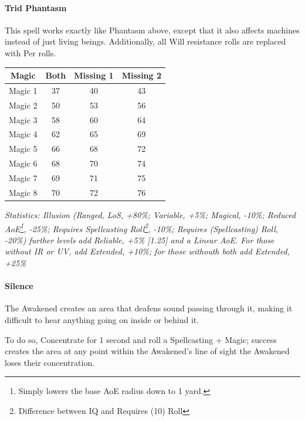 \begin{multicols*}{3}
	\paragraph{Trid Phantasm}
	
	This spell works exactly like Phantasm above, except that it also affects machines instead of just living beings. Additionally, all Will resistance rolls are replaced with Per rolls.
	
	\begin{center}
		\begin{adjustwidth}{-2.5mm}{}
		\begin{tabular}{|c|c|c|c|}
			\hline
			Magic & Both & Missing 1 & Missing 2 \\
			\hline
			\hline
			Magic 1 & 37 & 40 & 43 \\
			Magic 2 & 50 & 53 & 56 \\
			Magic 3 & 58 & 60 & 64 \\
			Magic 4 & 62 & 65 & 69 \\
			Magic 5 & 66 & 68 & 72 \\
			Magic 6 & 68 & 70 & 74 \\
			Magic 7 & 69 & 71 & 75 \\
			Magic 8 & 70 & 72 & 76 \\
			\hline
		\end{tabular}
		\end{adjustwidth}
	\end{center}
	
	\textcolor{OliveGreen}{\textit{Statistics: Illusion (Ranged, LoS, +80\%; Variable, +5\%; Magical, -10\%; Reduced AoE\footnote{Simply lowers the base AoE radius down to 1 yard.}, -25\%; Requires Spellcasting Roll\footnote{Difference between IQ and Requires (10) Roll}, -10\%; Requires (Spellcasting) Roll, -20\%) further levels add Reliable, +5\% [1.25] and a Linear AoE. For those without IR or UV, add Extended, +10\%; for those withouth both add Extended, +25\%}}
	
	\paragraph{Silence}
	
	The Awakened creates an area that deafens sound passing through it, making it difficult to hear anything going on inside or behind it.
	
	To do so, Concentrate for 1 second and roll a Spellcasting + Magic; success creates the area at any point within the Awakened's line of sight the Awakened loses their concentration.
	

\end{multicols*}
